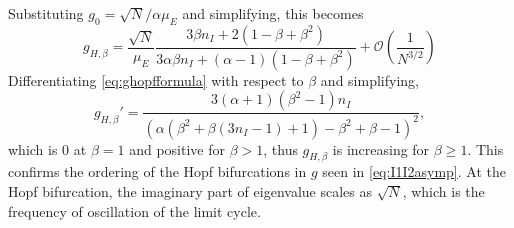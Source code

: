 \documentclass[11pt,reqno]{amsart}
\begin{document}
Substituting $g_0 = \sqrt{N}/\alpha \mu_{E}$ and simplifying, this becomes
\begin{equation}\label{eq:ghopfformula}
g_{H,\beta} = 
\frac{\sqrt{N}}{\mu_E} 
\frac{ 3 \beta n_I  + 2(1 - \beta + \beta^2 ) }
{ 3 \alpha \beta n_I + (\alpha - 1)(1 - \beta + \beta^2 ) }
+ \mathcal{O}\left( \frac{1}{N^{3/2}} \right)
\end{equation}
Differentiating \cref{eq:ghopfformula} with respect to $\beta$ and simplifying,
\begin{equation}\label{eq:gprime}
g_{H,\beta}' = 
    \frac{ 
    3 (\alpha+1) \left(\beta^2-1\right) n_I
    }
    {
    \left(\alpha \left(\beta^2+\beta (3 n_I -1)+1\right)-\beta^2+\beta-1\right)^2},
\end{equation}
which is 0 at $\beta = 1$ and positive for $\beta > 1$, thus $g_{H,\beta}$ is increasing for $\beta \geq 1$. This confirms the ordering of the Hopf bifurcations in $g$ seen in \cref{eq:I1I2asymp}. At the Hopf bifurcation, the imaginary part of eigenvalue scales as $\sqrt{N}$, which is the frequency of oscillation of the limit cycle.
\end{document}
